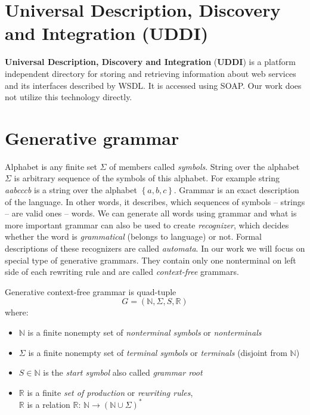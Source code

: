 \documentclass[12pt,notitlepage]{report}
\begin{document}
\section{Universal Description, Discovery and Integration (UDDI)}

\textbf{Universal Description, Discovery and Integration} (\textbf{UDDI}) is a platform independent directory for storing and retrieving information about web services and its interfaces described by WSDL. It is accessed using SOAP. Our work does not utilize this technology directly.

\section{Generative grammar}
Alphabet is any finite set $\Sigma$ of members called \textit{symbols}. String over the alphabet $\Sigma$ is arbitrary sequence of the symbols of this alphabet. For example string \textit{aabcccb} is a string over the alphabet $\left\lbrace a, b, c \right\rbrace$. Grammar is an exact description of the language. In other words, it describes, which sequences of symbols -- strings -- are valid ones -- words.
We can generate all words using grammar and what is more important grammar can also be used to create \textit{recognizer}, which decides whether the word is \textit{grammatical} (belongs to language) or not. Formal descriptions of these recognizers are called \textit{automata}. In our work we will focus on special type of generative grammars. They contain only one nonterminal on left side of each rewriting rule and are called \textit{context-free} grammars.

\begin{definition}
Generative context-free grammar is quad-tuple \[G = (\mathbb{N}, \Sigma, S, \mathbb{R})\] where:

\begin{itemize}
 \item $\mathbb{N}$ is a finite nonempty set of \textit{nonterminal symbols} or \textit{nonterminals}
 \item $\Sigma$ is a finite nonempty set of \textit{terminal symbols} or \textit{terminals} (disjoint from $\mathbb{N}$)
 \item $S \in \mathbb{N}$ is the \textit{start symbol} also called \textit{grammar root}
 \item $\mathbb{R}$ is a finite \textit{set of production} or \textit{rewriting rules}, \\
       $\mathbb{R}$ is a relation $\mathbb{R}$: $\mathbb{N} \rightarrow (\mathbb{N} \cup \Sigma)^{*}$
\end{itemize}
\end{definition}
\end{document}
